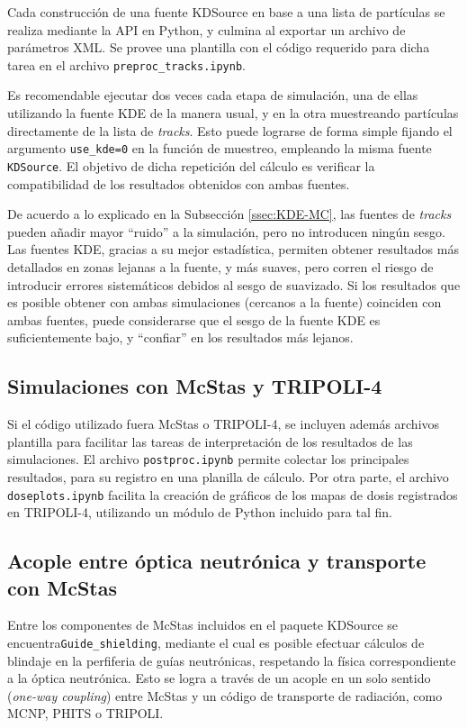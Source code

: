 Cada construcción de una fuente KDSource en base a una lista de partículas se realiza mediante la API en Python, y culmina al exportar un archivo de parámetros XML. Se provee una plantilla con el código requerido para dicha tarea en el archivo \verb|preproc_tracks.ipynb|.

Es recomendable ejecutar dos veces cada etapa de simulación, una de ellas utilizando la fuente KDE de la manera usual, y en la otra muestreando partículas directamente de la lista de \emph{tracks}. Esto puede lograrse de forma simple fijando el argumento \verb|use_kde=0| en la función de muestreo, empleando la misma fuente \verb|KDSource|. El objetivo de dicha repetición del cálculo es verificar la compatibilidad de los resultados obtenidos con ambas fuentes.

De acuerdo a lo explicado en la Subsección \ref{ssec:KDE-MC}, las fuentes de \emph{tracks} pueden añadir mayor ``ruido'' a la simulación, pero no introducen ningún sesgo. Las fuentes KDE, gracias a su mejor estadística, permiten obtener resultados más detallados en zonas lejanas a la fuente, y más suaves, pero corren el riesgo de introducir errores sistemáticos debidos al sesgo de suavizado. Si los resultados que es posible obtener con ambas simulaciones (cercanos a la fuente) coinciden con ambas fuentes, puede considerarse que el sesgo de la fuente KDE es suficientemente bajo, y ``confiar'' en los resultados más lejanos.


\subsection{Simulaciones con McStas y TRIPOLI-4}

Si el código utilizado fuera McStas o TRIPOLI-4, se incluyen además archivos plantilla para facilitar las tareas de interpretación de los resultados de las simulaciones. El archivo \verb|postproc.ipynb| permite colectar los principales resultados, para su registro en una planilla de cálculo. Por otra parte, el archivo \verb|doseplots.ipynb| facilita la creación de gráficos de los mapas de dosis registrados en TRIPOLI-4, utilizando un módulo de Python incluido para tal fin.


\subsection{Acople entre óptica neutrónica y transporte con McStas}

Entre los componentes de McStas incluidos en el paquete KDSource se encuentra\linebreak \verb|Guide_shielding|, mediante el cual es posible efectuar cálculos de blindaje en la perfiferia de guías neutrónicas, respetando la física correspondiente a la óptica neutrónica. Esto se logra a través de un acople en un solo sentido (\emph{one-way coupling}) entre McStas y un código de transporte de radiación, como MCNP, PHITS o TRIPOLI.

